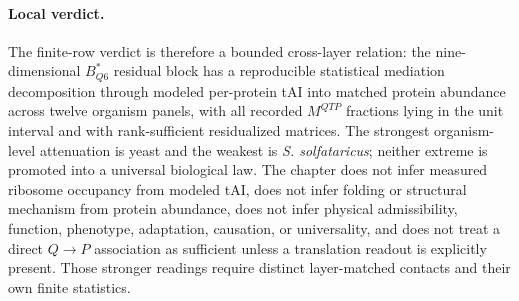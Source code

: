 \paragraph{Local verdict.}
The finite-row verdict is therefore a bounded cross-layer relation: the nine-dimensional $B^*_{Q6}$ residual block has a reproducible statistical mediation decomposition through modeled per-protein tAI into matched protein abundance across twelve organism panels, with all recorded $M^{QTP}$ fractions lying in the unit interval and with rank-sufficient residualized matrices.  The strongest organism-level attenuation is yeast and the weakest is \emph{S. solfataricus}; neither extreme is promoted into a universal biological law.  The chapter does not infer measured ribosome occupancy from modeled tAI, does not infer folding or structural mechanism from protein abundance, does not infer physical admissibility, function, phenotype, adaptation, causation, or universality, and does not treat a direct $Q\to P$ association as sufficient unless a translation readout is explicitly present.  Those stronger readings require distinct layer-matched contacts and their own finite statistics.

